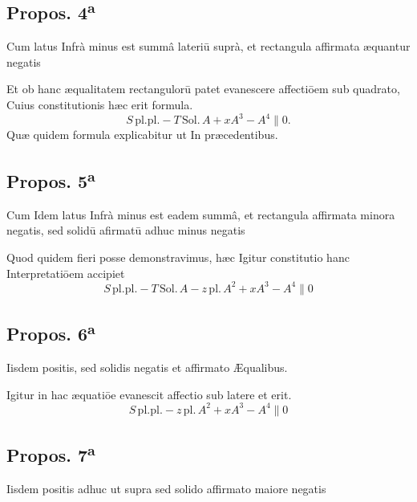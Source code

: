 \documentclass[11pt,a4paper]{article}
\begin{document}
\subsection*{Propos. 4\textsuperscript{a}}

Cum latus Infrà minus est summâ lateriū suprà, et rectangula affirmata æquantur negatis

Et ob hanc æqualitatem rectangulorū \ill{} patet evanescere affectiōem sub quadrato, Cuius constitutionis hæc erit formula.
\[ S\,\mathrm{pl.pl.} - T\,\mathrm{Sol.}\,A + xA^{3} - A^{4} \parallel 0. \]
Quæ quidem formula explicabitur ut In præcedentibus.

\subsection*{Propos. 5\textsuperscript{a}}

Cum Idem latus Infrà minus est eadem summâ, et rectangula affirmata minora  negatis, sed solidū afirmatū adhuc minus negatis

Quod quidem fieri posse demonstravimus, hæc Igitur constitutio hanc Interpretatiōem accipiet
\[ S\,\mathrm{pl.pl.} - T\,\mathrm{Sol.}\,A - z\,\mathrm{pl.}\,A^{2} + xA^{3} - A^{4} \parallel 0 \]

\subsection*{Propos. 6\textsuperscript{a}}

Iisdem positis, sed solidis negatis et affirmato Æqualibus.

Igitur in hac æquatiōe evanescit affectio sub latere et erit.
\[ S\,\mathrm{pl.pl.} - z\,\mathrm{pl.}\,A^{2} + xA^{3} - A^{4} \parallel 0 \]

\subsection*{Propos. 7\textsuperscript{a}}

Iisdem positis adhuc ut supra sed solido affirmato maiore negatis
\end{document}
